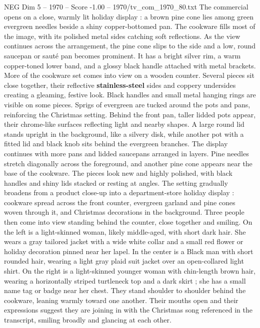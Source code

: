 \begin{textsample}{NEG Dim 5 – 1970 – Score -1.00 – 1970/tv\_com\_1970\_80.txt}  \label{ex:f5_neg_008}
The commercial opens on a close, warmly lit holiday display : a brown pine cone lies among green evergreen needles beside a shiny copper-bottomed pan.
The cookware fills most of the image, with its polished metal sides catching soft reflections.
As the view continues across the arrangement, the pine cone slips to the side and a low, round saucepan or sauté pan becomes prominent.
It has a bright silver rim, a warm copper-toned lower band, and a glossy black handle attached with metal brackets.
More of the cookware set comes into view on a wooden counter.
Several pieces sit close together, their reflective \textbf{stainless-steel} sides and coppery undersides creating a gleaming, festive look.
Black handles and small metal hanging rings are visible on some pieces.
Sprigs of evergreen are tucked around the pots and pans, reinforcing the Christmas setting.
Behind the front pan, taller lidded pots appear, their chrome-like surfaces reflecting light and nearby shapes.
A large round lid stands upright in the background, like a silvery disk, while another pot with a fitted lid and black knob sits behind the evergreen branches.
The display continues with more pans and lidded saucepans arranged in layers.
Pine needles stretch diagonally across the foreground, and another pine cone appears near the base of the cookware.
The pieces look new and highly polished, with black handles and shiny lids stacked or resting at angles.
The setting gradually broadens from a product close-up into a department-store holiday display : cookware spread across the front counter, evergreen garland and pine cones woven through it, and Christmas decorations in the background.
Three people then come into view standing behind the counter, close together and smiling.
On the left is a light-skinned woman, likely middle-aged, with short dark hair.
She wears a gray tailored jacket with a wide white collar and a small red flower or holiday decoration pinned near her lapel.
In the center is a Black man with short rounded hair, wearing a light gray plaid suit jacket over an open-collared light shirt.
On the right is a light-skinned younger woman with chin-length brown hair, wearing a horizontally striped turtleneck top and a dark skirt ; she has a small name tag or badge near her chest.
They stand shoulder to shoulder behind the cookware, leaning warmly toward one another.
Their mouths open and their expressions suggest they are joining in with the Christmas song referenced in the transcript, smiling broadly and glancing at each other.

\end{textsample}
